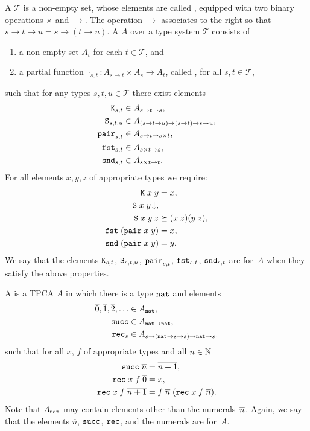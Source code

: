 A  $\mathcal{T}$ is a non-empty set, whose elements
are called , equipped with two binary operations $\times$
and $\to$. The operation $\to$ associates to the right so that $s \to
t \to u = s \to (t \to u)$. A  $A$ over a type system $\mathcal{T}$ consists of
%
\begin{enumerate}
\item a non-empty set $A_t$ for each $t \in \mathcal{T}$, and
\item a partial function $\cdot_{s,t} : A_{s \to t} \times A_s \to
  A_t$, called , for all $s, t \in \mathcal{T}$,
\end{enumerate}
%
such that for any types $s, t, u \in \mathcal{T}$ there exist elements
%
\begin{align*}
  \mathtt{K}_{s,t} &\in A_{s \to t \to s}, \\
  \mathtt{S}_{s,t,u} &\in A_{(s \to t \to u) \to (s \to t) \to s \to u}, \\
  \mathtt{pair}_{s,t} &\in A_{s \to t \to s \times t}, \\
  \mathtt{fst}_{s,t} &\in A_{s \times t \to s}, \\
  \mathtt{snd}_{s,t} &\in A_{s \times t \to t}.
\end{align*}
%
For all elements $x, y, z$ of appropriate types we require:
%
\begin{align*}
  \mathtt{K} \; x \; y &= x, \\
  \mathtt{S} \; x \; y\,{\downarrow}, & \\
  \mathtt{S} \; x \; y \; z &\succeq  (x \; z) (y \; z), \\
  \mathtt{fst} \; (\mathtt{pair} \; x \; y) &= x, \\
  \mathtt{snd} \; (\mathtt{pair} \; x \; y) &= y.
\end{align*}
%
We say that the elements $\mathtt{K}_{s,t}$, $\mathtt{S}_{s,t,u}$,
$\mathtt{pair}_{s,t}$, $\mathtt{fst}_{s,t}$, $\mathtt{snd}_{s,t}$ are
 for~$A$ when they satisfy the above properties.

A  is a TPCA $A$ in which there is a
type $\mathtt{nat}$ and elements
%
\begin{align*}
  \overline{0}, \overline{1}, \overline{2}, \ldots &\in A_{\mathtt{nat}}, \\
  \mathtt{succ} &\in A_{\mathtt{nat} \to \mathtt{nat}}, \\
  \mathtt{rec}_s &\in A_{s \to (\mathtt{nat} \to s \to s) \to \mathtt{nat} \to s}.
\end{align*}
%
such that for all $x$, $f$ of appropriate types and all $n \in \mathbb{N}$
%
\begin{align*}
  \mathtt{succ} \; \overline{n} &= \overline{n + 1}, \\
  \mathtt{rec} \; x \; f \; \overline{0} &= x, \\
  \mathtt{rec} \; x \; f \; \overline{n+1} &=
  f \; \overline{n} \; (\mathtt{rec} \; x \; f \; \overline{n}).
\end{align*}
%
Note that $A_{\mathtt{nat}}$ may contain elements other than the
numerals~$\overline{n}$. Again, we say that the elements
$\overline{n}$, $\mathtt{succ}$, $\mathtt{rec}$, and the numerals are
 for~$A$.

